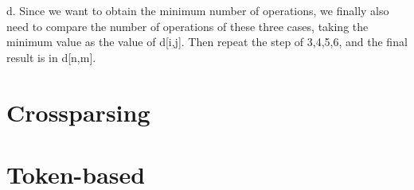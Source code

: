 \documentclass[]{article}
\begin{document}
d. Since we want to obtain the minimum number of operations, we finally also need to compare the number of operations of these three cases, taking the minimum value as the value of d[i,j]. Then repeat the step of 3,4,5,6, and the final result is in d[n,m].


\section{Crossparsing}

\section{Token-based}
\end{document}
